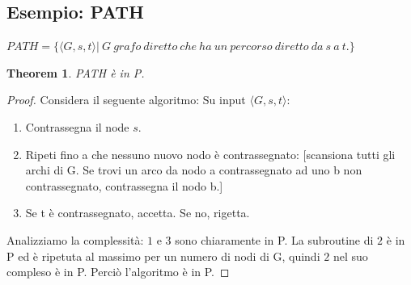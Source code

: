 \documentclass[a4paper, 12pt]{article}
\newtheorem{theorem}{Theorem}[section]
\begin{document}
\subsection{Esempio: PATH}
$PATH = \{\langle G,s,t \rangle |\ G\ grafo\ diretto\ che\ ha\ un\ percorso\ diretto\ da\ s\ a\ t.\}$

\begin{theorem}
PATH \`e in P.
\end{theorem}
\begin{proof}
Considera il seguente algoritmo: 
Su input $\langle G, s,t \rangle$:

\begin{enumerate}
\item Contrassegna il node $s$.
\item Ripeti fino a che nessuno nuovo nodo \`e contrassegnato: [scansiona tutti gli archi di G. Se trovi un arco da nodo a contrassegnato ad uno b non contrassegnato, contrassegna il nodo b.]
\item Se t \`e contrassegnato, accetta. Se no, rigetta.
\end{enumerate}
Analizziamo la complessit\`a: $1$ e $3$ sono chiaramente in P. La subroutine di $2$ \`e in P ed \`e ripetuta al massimo per un numero di nodi di G, quindi $2$ nel suo compleso \`e in P. Perci\`o l'algoritmo \`e in P.
\end{proof}
\end{document}
